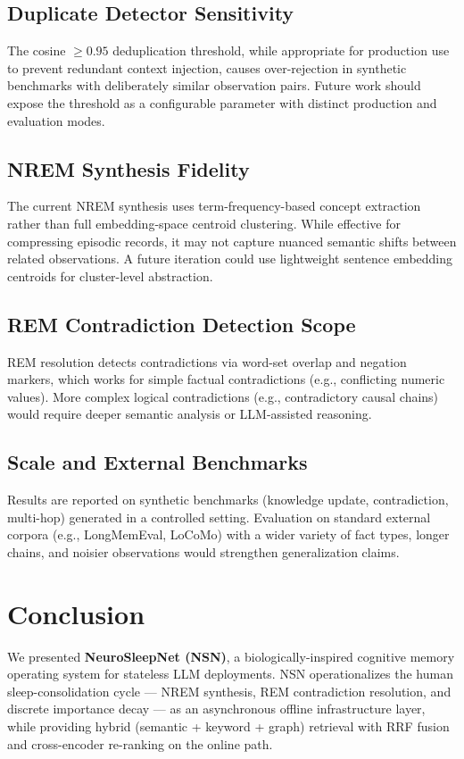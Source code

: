 \documentclass[conference]{IEEEtran}
\begin{document}
\subsection{Duplicate Detector Sensitivity}
The cosine $\geq 0.95$ deduplication threshold, while appropriate for production use to prevent redundant context injection, causes over-rejection in synthetic benchmarks with deliberately similar observation pairs. Future work should expose the threshold as a configurable parameter with distinct production and evaluation modes.

\subsection{NREM Synthesis Fidelity}
The current NREM synthesis uses term-frequency-based concept extraction rather than full embedding-space centroid clustering. While effective for compressing episodic records, it may not capture nuanced semantic shifts between related observations. A future iteration could use lightweight sentence embedding centroids for cluster-level abstraction.

\subsection{REM Contradiction Detection Scope}
REM resolution detects contradictions via word-set overlap and negation markers, which works for simple factual contradictions (e.g., conflicting numeric values). More complex logical contradictions (e.g., contradictory causal chains) would require deeper semantic analysis or LLM-assisted reasoning.

\subsection{Scale and External Benchmarks}
Results are reported on synthetic benchmarks (knowledge update, contradiction, multi-hop) generated in a controlled setting. Evaluation on standard external corpora (e.g., LongMemEval, LoCoMo) with a wider variety of fact types, longer chains, and noisier observations would strengthen generalization claims.

\section{Conclusion}

We presented \textbf{NeuroSleepNet (NSN)}, a biologically-inspired cognitive memory operating system for stateless LLM deployments. NSN operationalizes the human sleep-consolidation cycle --- NREM synthesis, REM contradiction resolution, and discrete importance decay --- as an asynchronous offline infrastructure layer, while providing hybrid (semantic + keyword + graph) retrieval with RRF fusion and cross-encoder re-ranking on the online path.
\end{document}
